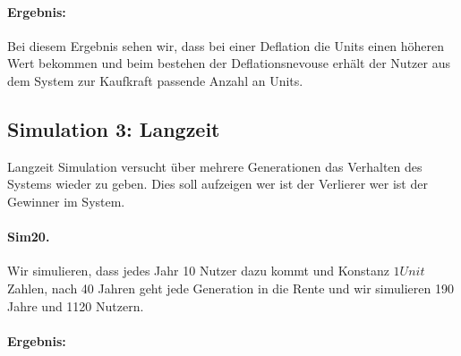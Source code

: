 \paragraph{Ergebnis:}

\begin{table}[hbt!]
\centering
{}
\end{table}

Bei diesem Ergebnis sehen wir, dass bei einer Deflation die Units einen höheren Wert bekommen und beim bestehen der Deflationsnevouse erhält der Nutzer aus dem System zur Kaufkraft passende Anzahl an Units.


\subsection{Simulation 3: Langzeit}

Langzeit Simulation versucht über mehrere Generationen das Verhalten des Systems wieder zu geben. Dies soll aufzeigen wer ist der Verlierer wer ist der Gewinner im System. \\

\paragraph{Sim20.} Wir simulieren, dass jedes Jahr 10 Nutzer dazu kommt und Konstanz $1 Unit$ Zahlen, nach 40 Jahren geht jede Generation in die Rente und wir simulieren 190 Jahre und 1120 Nutzern. 

\paragraph{Ergebnis:}

